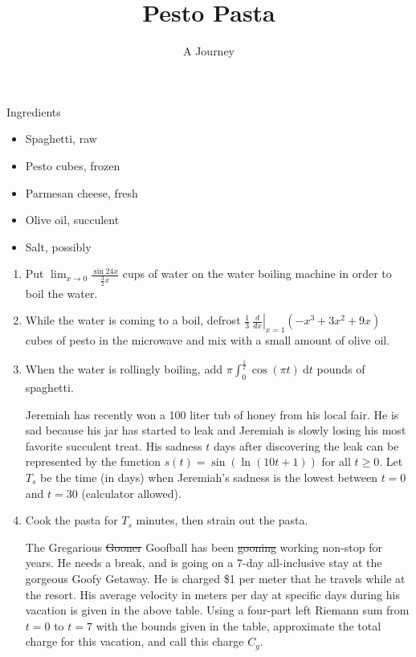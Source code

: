 \documentclass[]{article}
\title{Pesto Pasta}
\author{A Journey}
\date{}
\begin{document}
\maketitle

{\large Ingredients}
\begin{itemize}
	\item Spaghetti, raw
	\item Pesto cubes, frozen
	\item Parmesan cheese, fresh
	\item Olive oil, succulent
	\item Salt, possibly
\end{itemize}

\begin{enumerate}
	\item Put $\displaystyle \lim_{x \to 0}\frac{\sin 24x}{\frac{3}{2}x}$ cups of water on the water boiling machine in order to boil the water.
	\item While the water is coming to a boil, defrost $\displaystyle \frac{1}{3}\:\left.\frac{d}{dx}\right|_{x=1}\left(-x^3+3x^2+9x\right)$ cubes of pesto in the microwave and mix with a small amount of olive oil.
	
	\item When the water is rollingly boiling, add $\displaystyle \pi\int_0^{\frac{1}{2}}\cos(\pi t)\:\text{d}t$ pounds of spaghetti.
	
	\begin{mdframed}[hidealllines=true,backgroundcolor=grey]
		Jeremiah has recently won a 100 liter tub of honey from his local fair. He is sad because his jar has started to leak and Jeremiah is slowly losing his most favorite succulent treat. His sadness $t$ days after discovering the leak can be represented by the function $\displaystyle s(t)=\sin\left(\ln\left(10t+1\right)\right)$ for all $t\geq0$. Let $T_s$ be the time (in days) when Jeremiah's sadness is the lowest between $t=0$ and $t=30$ (calculator allowed).
	\end{mdframed}
	
	\item Cook the pasta for $\displaystyle T_s$ minutes, then strain out the pasta.
	
	\pagebreak
	
	\begin{mdframed}[hidealllines=true,backgroundcolor=grey]
		The Gregarious \st{Gooner} Goofball has been \st{gooning} working non-stop for years. He needs a break, and is going on a 7-day all-inclusive stay at the gorgeous Goofy Getaway. He is charged \$1 per meter that he travels while at the resort. His average velocity in meters per day at specific days during his vacation is given in the above table. Using a four-part left Riemann sum from $t=0$ to $t=7$ with the bounds given in the table, approximate the total charge for this vacation, and call this charge $C_g$.
	\end{mdframed}
	

\end{enumerate}
\end{document}

